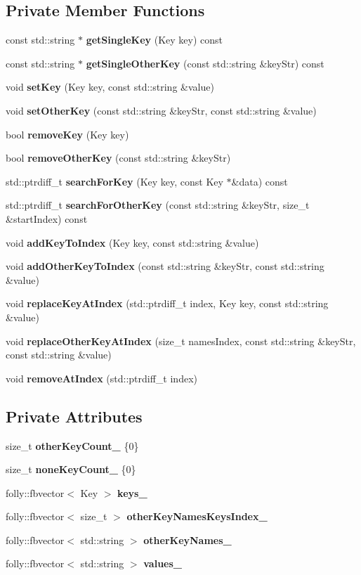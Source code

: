 \subsection*{Private Member Functions}
\begin{DoxyCompactItemize}
\item 
const std\+::string $\ast$ {\bf get\+Single\+Key} (Key key) const 
\item 
const std\+::string $\ast$ {\bf get\+Single\+Other\+Key} (const std\+::string \&key\+Str) const 
\item 
void {\bf set\+Key} (Key key, const std\+::string \&value)
\item 
void {\bf set\+Other\+Key} (const std\+::string \&key\+Str, const std\+::string \&value)
\item 
bool {\bf remove\+Key} (Key key)
\item 
bool {\bf remove\+Other\+Key} (const std\+::string \&key\+Str)
\item 
std\+::ptrdiff\+\_\+t {\bf search\+For\+Key} (Key key, const Key $\ast$\&data) const 
\item 
std\+::ptrdiff\+\_\+t {\bf search\+For\+Other\+Key} (const std\+::string \&key\+Str, size\+\_\+t \&start\+Index) const 
\item 
void {\bf add\+Key\+To\+Index} (Key key, const std\+::string \&value)
\item 
void {\bf add\+Other\+Key\+To\+Index} (const std\+::string \&key\+Str, const std\+::string \&value)
\item 
void {\bf replace\+Key\+At\+Index} (std\+::ptrdiff\+\_\+t index, Key key, const std\+::string \&value)
\item 
void {\bf replace\+Other\+Key\+At\+Index} (size\+\_\+t names\+Index, const std\+::string \&key\+Str, const std\+::string \&value)
\item 
void {\bf remove\+At\+Index} (std\+::ptrdiff\+\_\+t index)
\end{DoxyCompactItemize}
\subsection*{Private Attributes}
\begin{DoxyCompactItemize}
\item 
size\+\_\+t {\bf other\+Key\+Count\+\_\+} \{0\}
\item 
size\+\_\+t {\bf none\+Key\+Count\+\_\+} \{0\}
\item 
folly\+::fbvector$<$ Key $>$ {\bf keys\+\_\+}
\item 
folly\+::fbvector$<$ size\+\_\+t $>$ {\bf other\+Key\+Names\+Keys\+Index\+\_\+}
\item 
folly\+::fbvector$<$ std\+::string $>$ {\bf other\+Key\+Names\+\_\+}
\item 
folly\+::fbvector$<$ std\+::string $>$ {\bf values\+\_\+}
\end{DoxyCompactItemize}



